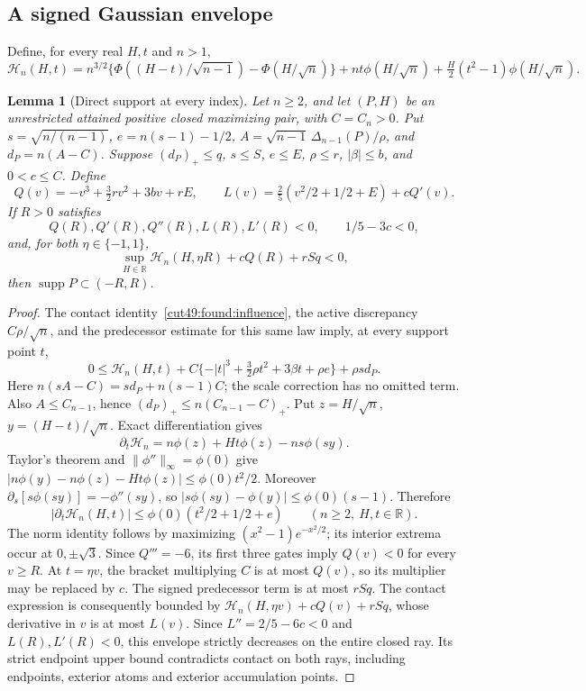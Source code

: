 \documentclass[11pt,a4paper]{article}
\numberwithin{equation}{section}
\newtheorem{lemma}[theorem]{Lemma}
\theoremstyle{definition}
\theoremstyle{remark}
\newcommand{\R}{\mathbb R}
\begin{document}
\subsection{A signed Gaussian envelope}
Define, for every real $H,t$ and $n>1$,
\[
 \mathcal H_n(H,t)=n^{3/2}\{\Phi((H-t)/\sqrt{n-1})-
             \Phi(H/\sqrt n)\}
       +nt\phi(H/\sqrt n)+\tfrac H2(t^2-1)\phi(H/\sqrt n).
\]
\begin{lemma}[Direct support at every index]\label{cut31:support:direct}
Let \(n\ge2\), and let \((P,H)\) be an unrestricted attained
positive closed maximizing pair, with \(C=C_n>0\).
Put \(s=\sqrt{n/(n-1)}\), \(e=n(s-1)-1/2\),
\(A=\sqrt{n-1}\,\Delta_{n-1}(P)/\rho\), and \(d_P=n(A-C)\).
Suppose \((d_P)_+\le q\), \(s\le S\), \(e\le E\),
\(\rho\le r\), \(|\beta|\le b\), and \(0<c\le C\).
Define
\[
 Q(v)=-v^3+\tfrac32rv^2+3bv+rE,\qquad
 L(v)=\tfrac25(v^2/2+1/2+E)+cQ'(v).
\]
If \(R>0\) satisfies
\[
 Q(R),Q'(R),Q''(R),L(R),L'(R)<0,\qquad 1/5-3c<0,
\]
and, for both \(\eta\in\{-1,1\}\),
\[
 \sup_{H\in\R}\mathcal H_n(H,\eta R)+cQ(R)+rSq<0,
\]
then \(\operatorname{supp}P\subset(-R,R)\).
\end{lemma}
\begin{proof}
The contact identity~\eqref{cut49:found:influence}, the active
discrepancy \(C\rho/\sqrt n\), and the predecessor estimate
for this same law imply, at every support point \(t\),
\[
 0\le\mathcal H_n(H,t)
 +C\{-|t|^3+\tfrac32\rho t^2+3\beta t+\rho e\}
 +\rho s d_P.
\]
Here \(n(sA-C)=s d_P+n(s-1)C\); the scale correction has
no omitted term. Also \(A\le C_{n-1}\), hence
\((d_P)_+\le n(C_{n-1}-C)_+\).
Put \(z=H/\sqrt n\), \(y=(H-t)/\sqrt n\).
Exact differentiation gives
\[
 \partial_t\mathcal H_n=n\phi(z)+Ht\phi(z)-ns\phi(sy).
\]
Taylor's theorem and \(\|\phi''\|_\infty=\phi(0)\) give
\( |n\phi(y)-n\phi(z)-Ht\phi(z)|\le\phi(0)t^2/2\).
Moreover \(\partial_s[s\phi(sy)]=-\phi''(sy)\), so
\(|s\phi(sy)-\phi(y)|\le\phi(0)(s-1)\). Therefore
\[
 |\partial_t\mathcal H_n(H,t)|
 \le\phi(0)(t^2/2+1/2+e)
 \qquad(n\ge2,\ H,t\in\R).
\]
The norm identity follows by maximizing
\((x^2-1)e^{-x^2/2}\); its interior extrema occur at
\(0,\pm\sqrt3\).
Since \(Q'''=-6\), its first three gates imply \(Q(v)<0\)
for every \(v\ge R\). At \(t=\eta v\), the bracket multiplying
\(C\) is at most \(Q(v)\), so its multiplier may be replaced
by \(c\). The signed predecessor term is at most \(rSq\).
The contact expression is consequently bounded by
\(\mathcal H_n(H,\eta v)+cQ(v)+rSq\), whose derivative
in \(v\) is at most \(L(v)\). Since
\(L''=2/5-6c<0\) and \(L(R),L'(R)<0\), this envelope strictly
decreases on the entire closed ray. Its strict endpoint upper
bound contradicts contact on both rays, including endpoints,
exterior atoms and exterior accumulation points.
\end{proof}
\end{document}
